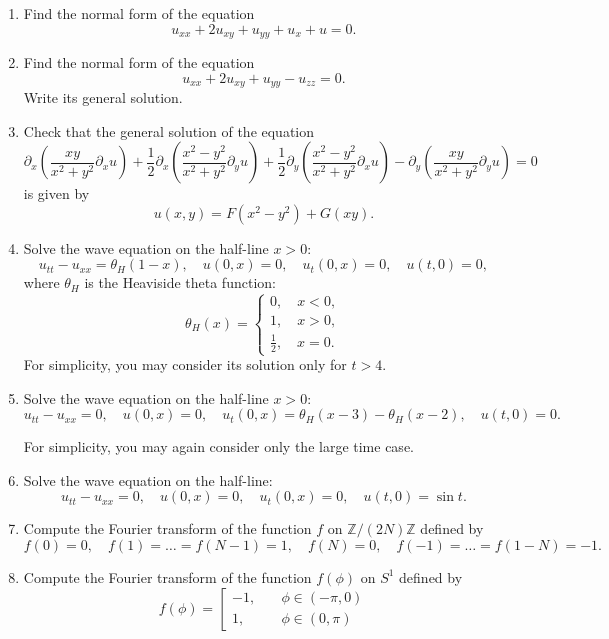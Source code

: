 \documentclass[a4paper,11pt]{article}
\title{}
\author{}
\date{}
\begin{document}

\begin{enumerate}
\item\label{item:1} Find the normal form of the equation \[u_{xx}+2 u_{xy}+u_{yy}+u_x+u=0.\]

\item\label{item:2} Find the normal form of the equation \[u_{xx}+2u_{xy}+u_{yy}-u_{zz}=0.\] Write its general solution.

\item\label{item:3} Check that the general solution of the equation \[\partial_x \left(\frac{x y}{x^2+y^2}\partial_x u\right)+\frac12 \partial_x \left(\frac{x^2-y^2}{x^2+y^2}\partial_y u\right)+\frac12 \partial_y \left(\frac{x^2-y^2}{x^2+y^2}\partial_x u\right) - \partial_y\left(\frac{x y}{x^2+y^2}\partial_y u\right)=0\]
is given by
\[u(x,y)=F(x^2-y^2)+G(x y).\]

\item\label{item:4} Solve the wave equation on the half-line \(x>0\):
\[u_{tt}-u_{xx}=\theta_H(1-x), \quad u(0,x)=0, \quad u_t(0,x)=0, \quad u(t,0)=0,\]
where
\(\theta_H\) is the Heaviside theta function:
\[\theta_H(x)=\left\{
\begin{array}{l}0, \quad x<0,\\
1, \quad x>0,\\
\frac12, \quad x=0.
\end{array}
\right.
\]
For simplicity, you may consider its solution only for \(t>4\).

\item\label{item:5} Solve the wave equation on the half-line \(x>0\):
\[
u_{tt}-u_{xx}=0, \quad u(0,x)=0, \quad u_t(0,x)=\theta_H(x-3)-\theta_H(x-2), \quad u(t,0)=0.
\]

For simplicity, you may again consider only the large time case.

\item\label{item:6} Solve the wave equation on the half-line:
\[
u_{tt}-u_{xx}=0, \quad u(0,x)=0, \quad u_t(0,x)=0, \quad u(t,0)=\sin t.
\]

\item\label{item:7} Compute the Fourier transform of the function \(f\) on \(\mathbb{Z}/(2N) \mathbb{Z}\) defined by
\[
f(0)=0, \quad f(1)=\ldots =f(N-1)=1, \quad f(N)=0, \quad f(-1)=\ldots =f(1-N)=-1.
\]

\item\label{item:8} Compute the Fourier transform of the  function \(f(\phi)\) on \(S^1\) defined by
\[
f(\phi)=\left[\begin{aligned}-1, & \quad \phi\in(-\pi,0)\\1, & \quad \phi\in(0,\pi)\end{aligned}\right.
\]


\end{enumerate}
\end{document}
